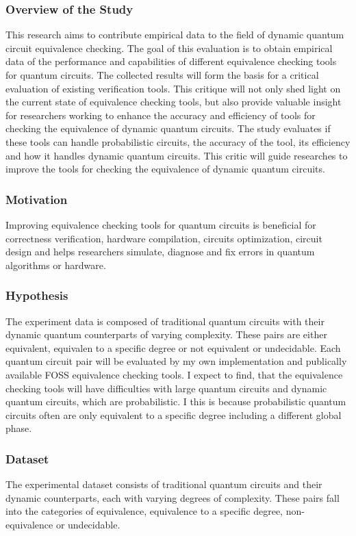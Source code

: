 \documentclass[11pt]{article}
\theoremstyle{definition}
\theoremstyle{definition}
\begin{document}
\subsubsection{Overview of the Study}
\label{sec:org57c9867}
This research aims to contribute empirical data to the field of dynamic
quantum circuit equivalence checking. The goal of this evaluation is to
obtain empirical data of the performance and capabilities of different
equivalence checking tools for quantum circuits. The collected results will
form the basis for a critical evaluation of existing verification tools.
This critique will not only shed light on the current state of equivalence
checking tools, but also provide valuable insight for researchers working
to enhance the accuracy and efficiency of tools for checking the
equivalence of dynamic quantum circuits. The study evaluates if these tools
can handle probabilistic circuits, the accuracy of the tool, its efficiency
and how it handles dynamic quantum circuits. This critic will guide
researches to improve the tools for checking the equivalence of dynamic
quantum circuits.

\subsubsection{Motivation}
\label{sec:orga2cccf9}
Improving equivalence checking tools for quantum circuits is beneficial for
correctness verification, hardware compilation, circuits optimization,
circuit design and helps researchers simulate, diagnose and fix errors in
quantum algorithms or hardware.

\subsubsection{Hypothesis}
\label{sec:orga09dc74}
The experiment data is composed of traditional quantum circuits with their
dynamic quantum counterparts of varying complexity. These pairs are either
equivalent, equivalen to a specific degree or not equivalent or
undecidable. Each quantum circuit pair will be evaluated by my own
implementation and publically available FOSS equivalence checking tools. I
expect to find, that the equivalence checking tools will have difficulties
with large quantum circuits and dynamic quantum circuits, which are
probabilistic. I this is because probabilistic quantum circuits
often are only equivalent to a specific degree including a different
global phase.

\subsubsection{Dataset}
\label{sec:org392ca1f}
The experimental dataset consists of traditional quantum circuits and their
dynamic counterparts, each with varying degrees of complexity. These pairs
fall into the categories of equivalence, equivalence to a specific degree,
non-equivalence or undecidable.
\end{document}
